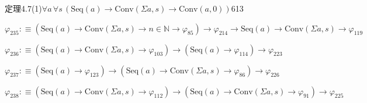 \begin{fullproof}{定理4.7(1)}{$\forall a\,\forall s\,(\mathrm{Seq}(a) \to \mathrm{Conv}(\Sigma a,s) \to \mathrm{Conv}(a,0))$}{613}
\begin{abbrevlist}
\item $\varphi_{235} :\equiv (\mathrm{Seq}(a) \to \mathrm{Conv}(\Sigma a,s) \to n \in \mathbb{N} \to \varphi_{85}) \to \varphi_{214} \to \mathrm{Seq}(a) \to \mathrm{Conv}(\Sigma a,s) \to \varphi_{119}$
\item $\varphi_{236} :\equiv (\mathrm{Seq}(a) \to \mathrm{Conv}(\Sigma a,s) \to \varphi_{103}) \to (\mathrm{Seq}(a) \to \varphi_{114}) \to \varphi_{223}$
\item $\varphi_{237} :\equiv (\mathrm{Seq}(a) \to \varphi_{123}) \to (\mathrm{Seq}(a) \to \mathrm{Conv}(\Sigma a,s) \to \varphi_{86}) \to \varphi_{226}$
\item $\varphi_{238} :\equiv (\mathrm{Seq}(a) \to \mathrm{Conv}(\Sigma a,s) \to \varphi_{112}) \to (\mathrm{Seq}(a) \to \mathrm{Conv}(\Sigma a,s) \to \varphi_{91}) \to \varphi_{225}$
\end{abbrevlist}
\end{fullproof}

